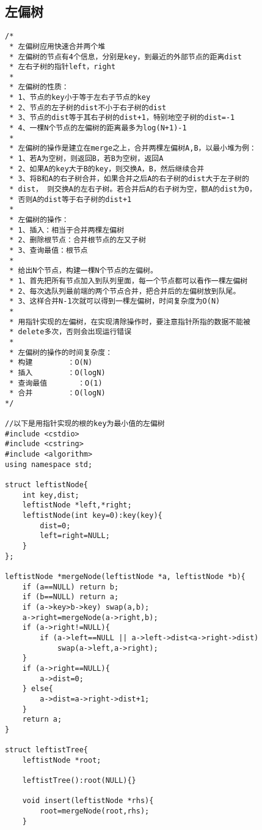 \subsection{左偏树}
\begin{verbatim}
/*
 * 左偏树应用快速合并两个堆
 * 左偏树的节点有4个信息，分别是key，到最近的外部节点的距离dist
 * 左右子树的指针left，right
 *
 * 左偏树的性质：
 * 1、节点的key小于等于左右子节点的key
 * 2、节点的左子树的dist不小于右子树的dist
 * 3、节点的dist等于其右子树的dist+1，特别地空子树的dist=-1
 * 4、一棵N个节点的左偏树的距离最多为log(N+1)-1
 *
 * 左偏树的操作是建立在merge之上，合并两棵左偏树A,B，以最小堆为例：
 * 1、若A为空树，则返回B，若B为空树，返回A
 * 2、如果A的key大于B的key，则交换A，B，然后继续合并
 * 3、将B和A的右子树合并，如果合并之后A的右子树的dist大于左子树的
 * dist， 则交换A的左右子树。若合并后A的右子树为空，额A的dist为0，
 * 否则A的dist等于右子树的dist+1
 * 
 * 左偏树的操作：
 * 1、插入：相当于合并两棵左偏树
 * 2、删除根节点：合并根节点的左又子树
 * 3、查询最值：根节点
 *
 * 给出N个节点，构建一棵N个节点的左偏树。
 * 1、首先把所有节点加入到队列里面，每一个节点都可以看作一棵左偏树
 * 2、每次选队列最前端的两个节点合并，把合并后的左偏树放到队尾。
 * 3、这样合并N-1次就可以得到一棵左偏树，时间复杂度为O(N)
 * 
 * 用指针实现的左偏树，在实现清除操作时，要注意指针所指的数据不能被
 * delete多次，否则会出现运行错误
 *
 * 左偏树的操作的时间复杂度：
 * 构建        ：O(N)
 * 插入        ：O(logN)
 * 查询最值       ：O(1)
 * 合并        ：O(logN)
*/

//以下是用指针实现的根的key为最小值的左偏树
#include <cstdio>
#include <cstring>
#include <algorithm>
using namespace std;

struct leftistNode{
    int key,dist;
    leftistNode *left,*right;
    leftistNode(int key=0):key(key){
        dist=0;
        left=right=NULL;
    }
};

leftistNode *mergeNode(leftistNode *a, leftistNode *b){
    if (a==NULL) return b;
    if (b==NULL) return a;
    if (a->key>b->key) swap(a,b);
    a->right=mergeNode(a->right,b);
    if (a->right!=NULL){
        if (a->left==NULL || a->left->dist<a->right->dist)
            swap(a->left,a->right);
    }
    if (a->right==NULL){
        a->dist=0;
    } else{
        a->dist=a->right->dist+1;
    }
    return a;
}

struct leftistTree{
    leftistNode *root;

	leftistTree():root(NULL){}

    void insert(leftistNode *rhs){
        root=mergeNode(root,rhs);
    }


\end{verbatim}
